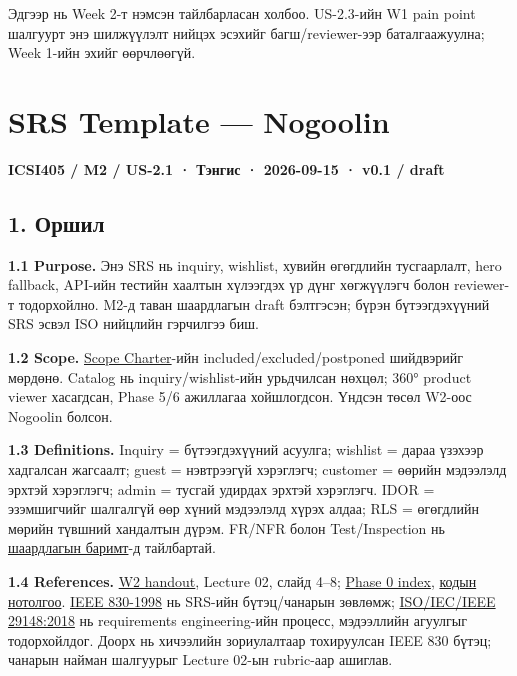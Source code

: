 \documentclass[
  11pt,
  a4paper,
]{article}
\begin{document}
Эдгээр нь Week 2-т нэмсэн тайлбарласан холбоо. US-2.3-ийн W1 pain point
шалгуурт энэ шилжүүлэлт нийцэх эсэхийг багш/reviewer-ээр баталгаажуулна;
Week 1-ийн эхийг өөрчлөөгүй.

\clearpage
\section{SRS Template --- Nogoolin}\label{doc3-srs-template-nogoolin}

\textbf{ICSI405 / M2 / US-2.1 · Тэнгис · 2026-09-15 · v0.1 / draft}

\subsection{1. Оршил}\label{doc3-ux43eux440ux448ux438ux43b}

\textbf{1.1 Purpose.} Энэ SRS нь inquiry, wishlist, хувийн өгөгдлийн
тусгаарлалт, hero fallback, API-ийн тестийн хаалтын хүлээгдэх үр дүнг
хөгжүүлэгч болон reviewer-т тодорхойлно. M2-д таван шаардлагын draft
бэлтгэсэн; бүрэн бүтээгдэхүүний SRS эсвэл ISO нийцлийн гэрчилгээ биш.

\textbf{1.2 Scope.} \href{../../requirements/scope-charter.md}{Scope
Charter}-ийн included/excluded/postponed шийдвэрийг мөрдөнө. Catalog нь
inquiry/wishlist-ийн урьдчилсан нөхцөл; 360° product viewer хасагдсан,
Phase 5/6 ажиллагаа хойшлогдсон. Үндсэн төсөл W2-оос Nogoolin болсон.

\textbf{1.3 Definitions.} Inquiry = бүтээгдэхүүний асуулга; wishlist =
дараа үзэхээр хадгалсан жагсаалт; guest = нэвтрээгүй хэрэглэгч; customer
= өөрийн мэдээлэлд эрхтэй хэрэглэгч; admin = тусгай удирдах эрхтэй
хэрэглэгч. IDOR = эзэмшигчийг шалгалгүй өөр хүний мэдээлэлд хүрэх алдаа;
RLS = өгөгдлийн мөрийн түвшний хандалтын дүрэм. FR/NFR болон
Test/Inspection нь \href{../../requirements/requirements.md}{шаардлагын
баримт}-д тайлбартай.

\textbf{1.4 References.}
\href{Software_Project_Documentation_Week_02_Handout.pdf}{W2 handout},
Lecture 02, слайд 4--8; \href{../../phase-0/README.md}{Phase 0 index},
\href{../../requirements/traceability-matrix.md}{кодын нотолгоо}.
\href{https://ieeexplore.ieee.org/document/720574}{IEEE 830-1998} нь
SRS-ийн бүтэц/чанарын зөвлөмж;
\href{https://www.iso.org/standard/72089.html}{ISO/IEC/IEEE 29148:2018}
нь requirements engineering-ийн процесс, мэдээллийн агуулгыг
тодорхойлдог. Доорх нь хичээлийн зориулалтаар тохируулсан IEEE 830
бүтэц; чанарын найман шалгуурыг Lecture 02-ын rubric-аар ашиглав.
\end{document}
